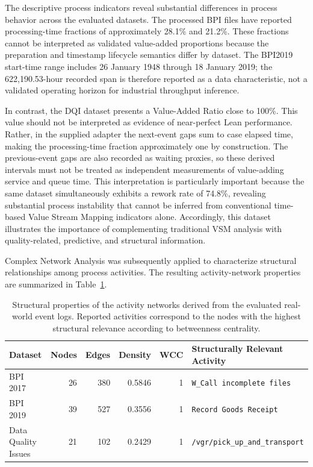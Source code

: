 \documentclass[pdflatex,iicol,Numbered,sn-basic]{sn-jnl}
\begin{document}
The descriptive process indicators reveal substantial differences in process
behavior across the evaluated datasets. The processed BPI files have reported processing-time fractions of approximately 28.1\% and 21.2\%. These fractions cannot be interpreted as validated value-added proportions because the preparation and timestamp lifecycle semantics differ by dataset. The BPI2019 start-time range includes 26 January 1948 through 18 January 2019; the 622,190.53-hour recorded span is therefore reported as a data characteristic, not a validated operating horizon for industrial throughput inference.

In contrast, the DQI dataset presents a Value-Added Ratio close to
100\%. This value should not be interpreted as evidence of near-perfect Lean
performance. Rather, in the supplied adapter the next-event gaps sum to case elapsed time, making the processing-time fraction approximately one by construction. The previous-event gaps are also recorded as waiting proxies, so these derived intervals must not be treated as independent measurements of value-adding service and queue time. This interpretation is particularly important
because the same dataset simultaneously exhibits a rework rate of
74.8\%, revealing substantial process instability that cannot be inferred
from conventional time-based Value Stream Mapping indicators alone.
Accordingly, this dataset illustrates the importance of complementing
traditional VSM analysis with quality-related, predictive, and structural
information.

Complex Network Analysis was subsequently applied to characterize structural
relationships among process activities. The resulting activity-network
properties are summarized in
Table~\ref{tab:network_metrics}.

\begin{table}[t]
\caption{
Structural properties of the activity networks derived from the evaluated
real-world event logs. Reported activities correspond to the nodes with the
highest structural relevance according to betweenness centrality.
}
\label{tab:network_metrics}
\centering
\small
\begin{tabularx}{\textwidth}{lrrrrX}
\toprule
\textbf{Dataset} &
\textbf{Nodes} &
\textbf{Edges} &
\textbf{Density} &
\textbf{WCC} &
\textbf{Structurally Relevant Activity} \\
\midrule

BPI 2017 & 26 & 380 & 0.5846 & 1 & \texttt{W\_Call incomplete files} \\
BPI 2019 & 39 & 527 & 0.3556 & 1 & \texttt{Record Goods Receipt} \\
Data Quality Issues & 21 & 102 & 0.2429 & 1 & \texttt{/vgr/pick\_up\_and\_transport} \\
\bottomrule
\end{tabularx}
\end{table}
\end{document}
